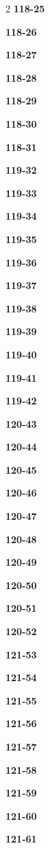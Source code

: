 \documentclass[10pt,a4paper]{article}
\begin{document}
\begin{multicols}{2}
\noindent\textbf{118-25}\ \par
\noindent\textbf{118-26}\ \par
\noindent\textbf{118-27}\ \par
\noindent\textbf{118-28}\ \par
\noindent\textbf{118-29}\ \par
\noindent\textbf{118-30}\ \par
\noindent\textbf{118-31}\ \par
\noindent\textbf{119-32}\ \par
\noindent\textbf{119-33}\ \par
\noindent\textbf{119-34}\ \par
\noindent\textbf{119-35}\ \par
\noindent\textbf{119-36}\ \par
\noindent\textbf{119-37}\ \par
\noindent\textbf{119-38}\ \par
\noindent\textbf{119-39}\ \par
\noindent\textbf{119-40}\ \par
\noindent\textbf{119-41}\ \par
\noindent\textbf{119-42}\ \par
\noindent\textbf{120-43}\ \par
\noindent\textbf{120-44}\ \par
\noindent\textbf{120-45}\ \par
\noindent\textbf{120-46}\ \par
\noindent\textbf{120-47}\ \par
\noindent\textbf{120-48}\ \par
\noindent\textbf{120-49}\ \par
\noindent\textbf{120-50}\ \par
\noindent\textbf{120-51}\ \par
\noindent\textbf{120-52}\ \par
\noindent\textbf{121-53}\ \par
\noindent\textbf{121-54}\ \par
\noindent\textbf{121-55}\ \par
\noindent\textbf{121-56}\ \par
\noindent\textbf{121-57}\ \par
\noindent\textbf{121-58}\ \par
\noindent\textbf{121-59}\ \par
\noindent\textbf{121-60}\ \par
\noindent\textbf{121-61}\ \par

\end{multicols}
\end{document}

